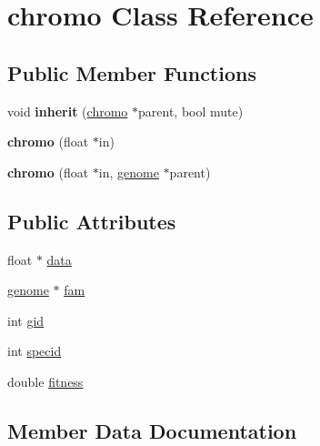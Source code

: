 \hypertarget{classchromo}{}\section{chromo Class Reference}
\label{classchromo}
\subsection*{Public Member Functions}
\begin{DoxyCompactItemize}
\item 
\hypertarget{classchromo_a6a009060ed8aeb4a4922639d13211b80}{}\label{classchromo_a6a009060ed8aeb4a4922639d13211b80} 
void {\bfseries inherit} (\hyperlink{classchromo}{chromo} $\ast$parent, bool mute)
\item 
\hypertarget{classchromo_a73797a905a71da364dcb7b790a7f620c}{}\label{classchromo_a73797a905a71da364dcb7b790a7f620c} 
{\bfseries chromo} (float $\ast$in)
\item 
\hypertarget{classchromo_aed7f5e45619f236512286ea5a88eb34c}{}\label{classchromo_aed7f5e45619f236512286ea5a88eb34c} 
{\bfseries chromo} (float $\ast$in, \hyperlink{classgenome}{genome} $\ast$parent)
\end{DoxyCompactItemize}
\subsection*{Public Attributes}
\begin{DoxyCompactItemize}
\item 
float $\ast$ \hyperlink{classchromo_a683bbd4f321d66732b25ed24a35d83c4}{data}
\item 
\hyperlink{classgenome}{genome} $\ast$ \hyperlink{classchromo_a7242cfd29fcd1c2a49435932652ded93}{fam}
\item 
int \hyperlink{classchromo_a5385ce1e06960fce8931a7b243a2746c}{gid}
\item 
int \hyperlink{classchromo_a538577d1df21c7c7b64ea2360edbe259}{specid}
\item 
double \hyperlink{classchromo_af32306a44e01d8aece6dc0a28be4af96}{fitness}
\end{DoxyCompactItemize}


\subsection{Member Data Documentation}
\hypertarget{classchromo_a683bbd4f321d66732b25ed24a35d83c4}{}\label{classchromo_a683bbd4f321d66732b25ed24a35d83c4} 
